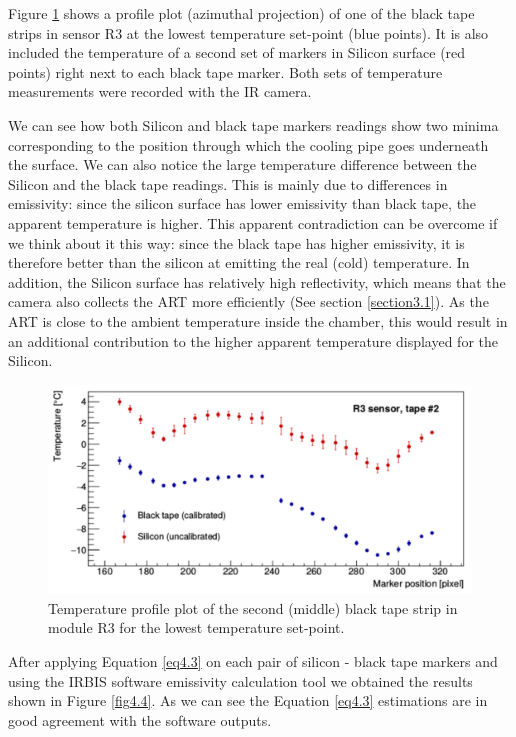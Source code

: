 		Figure \ref{fig4.3} shows a profile plot (azimuthal projection) of one of the black tape strips in sensor R3 at the lowest temperature set-point (blue points). It is also included the temperature of a second set of markers in Silicon surface (red points) right next to each black tape marker. Both sets of temperature measurements were recorded with the IR camera. 
		
		We can see how both Silicon and black tape markers readings show two minima corresponding to the position through which the cooling pipe goes underneath the surface. We can also notice the large temperature difference between the Silicon and the black tape readings. This is mainly due to differences in emissivity: since the silicon surface has lower emissivity than black tape, the apparent temperature is higher. This apparent contradiction can be overcome if we think about it this way: since the black tape has higher emissivity, it is therefore better than the silicon at emitting the real (cold) temperature.
		In addition, the Silicon surface has relatively high reflectivity, which means that the camera also collects the ART more efficiently (See section \ref{section3.1}). As the ART is close to the ambient temperature inside the chamber, this would result in an additional contribution to the higher apparent temperature displayed for the Silicon.
		
		\begin{figure}[ht!]
			\centering
			\captionsetup{justification=centering,margin=2cm}
			\includegraphics[scale=0.35]{Figures/Chapter04/R3Profile_Si_and_BT.jpg}
			\caption{Temperature profile plot of the second (middle) black tape strip in module R3 for the lowest temperature set-point.}\label{fig4.3}
		\end{figure}
		
		After applying Equation \ref{eq4.3} on each pair of silicon - black tape markers and using the IRBIS software emissivity calculation tool we obtained the results shown in Figure \ref{fig4.4}. As we can see the Equation \ref{eq4.3} estimations are in good agreement with the software outputs. 
		
